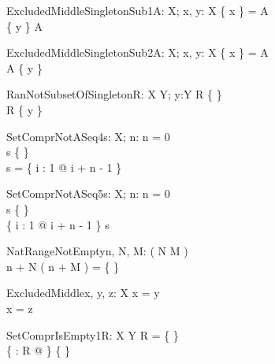 \begin{theorem}{ExcludedMiddleSingletonSub1}{A: \power X; \const x, \const y: X}
\{ x \} = A \\
\{ y \} \subset A
\end{theorem}

\begin{theorem}{ExcludedMiddleSingletonSub2}{A: \power X; \const x, \const y: X}
\{ x \} = A \\
A  \subset \{ y \}
\end{theorem}

\begin{theorem}{RanNotSubsetOfSingleton}{R: X \rel Y; y:Y}
R \neq \{ \} \\
\ran R \subset \{ y \} 
\end{theorem}



\begin{theorem}{SetComprNotASeq4}{s: \seq X; n: \nat}
n = 0 \\
s \neq \{ \} \\
\dom s = \dom \{ i : 1 \upto \anything @ i + n - 1 \mapsto \anything \}
\end{theorem}

\begin{theorem}{SetComprNotASeq5}{s: \seq X; n: \nat}
n = 0 \\
s \neq \{ \} \\
\dom \{ i : 1 \upto \anything @ i + n - 1 \mapsto \anything \} \subset \dom s
\end{theorem}

\begin{theorem}{NatRangeNotEmpty}{n, \const N, \const M: \nat}
\eval( N \leq M ) \\
n + N \upto ( n + M ) = \{ \}
\end{theorem}

\begin{theorem}{ExcludedMiddle}{x, \const y, \const z: X}
x = y \\
x = z
\end{theorem}


\begin{theorem}{SetComprIsEmpty1}{R: X \rel Y}
R = \{ \} \\
\{ \anything : \dom R @ \anything \} \neq \{ \}
\end{theorem}

